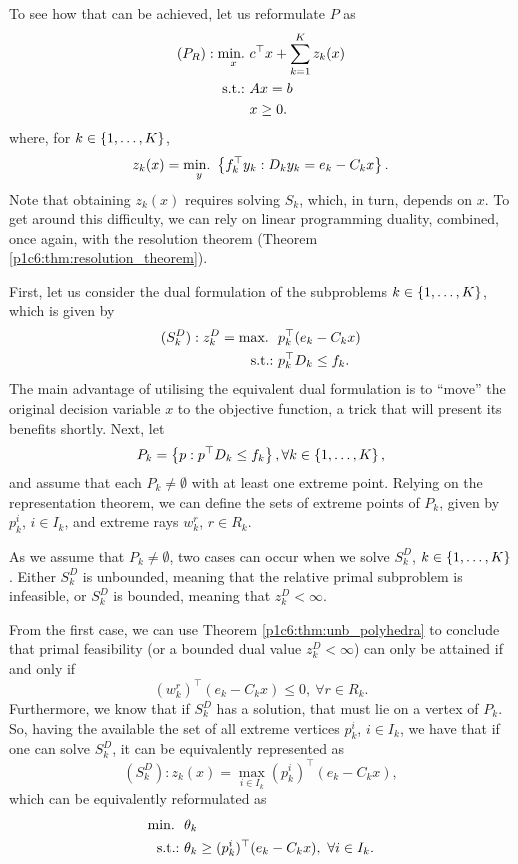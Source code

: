 To see how that can be achieved, let us reformulate $P$ as 
%
\begin{align*}
	(P_R) : \mathop{\text{min.~}}_x & c^\top x + \sum_{k=1}^K z_k(x) \\
	\mathop{\text{s.t.:~}}   & Ax = b \\
	      & x \geq 0.
\end{align*}
%
where, for $k \in \left\{ 1,\dots, K \right \}$,  
%
\begin{equation*}
	z_k(x) = \mathop{\text{min.~}}_y \left\{ f_k^\top y_k : D_ky_k = e_k - C_k x \right \}.	
\end{equation*}
%
Note that obtaining $z_k(x)$ requires solving $S_k$, which, in turn, depends on $x$. To get around this difficulty, we can rely on linear programming duality, combined, once again, with the resolution theorem (Theorem \ref{p1c6:thm:resolution_theorem}).

First, let us consider the dual formulation of the subproblems $k \in \left\{ 1,\dots, K \right \}$, which is given by
%
\begin{align*}
	(S^D_k) : z^D_k = \mathop{\text{max.~}} \ & p_k^\top (e_k - C_k x) \\
	\mathop{\text{s.t.:~}}   & p_k^\top D_k \leq f_k.	 
\end{align*}
%
The main advantage of utilising the equivalent dual formulation is to ``move'' the original decision variable $x$ to the objective function, a trick that will present its benefits shortly. Next, let 
%
\begin{equation}
	P_k =\left\{ p : p^\top D_k \leq f_k \right \}, \forall k \in \left\{ 1,\dots,K \right \}, 
\end{equation}
%
and assume that each $P_k \neq \emptyset$ with at least one extreme point. Relying on the representation theorem, we can define the sets of extreme points of $P_k$, given by $p_k^i$, $i \in I_k$, and extreme rays $w^r_k$, $r \in R_k$.

As we assume that $P_k \neq \emptyset$, two cases can occur when we solve $S^D_k$, $k \in \left\{ 1,\dots, K \right \}$. Either $S^D_k$ is unbounded, meaning that the relative primal subproblem is infeasible, or $S^D_k$ is bounded, meaning that $z^D_k < \infty$.

From the first case, we can use Theorem \ref{p1c6:thm:unb_polyhedra} to conclude that primal feasibility (or a bounded dual value $z^D_k < \infty$) can only be attained if and only if
%
\begin{equation}
	(w^r_k)^\top (e_k - C_k x) \leq 0, \ \forall r \in R_k. \label{p1c7:eq:feas_cut_all}	
\end{equation}
%
Furthermore, we know that if $S^D_k$ has a solution, that must lie on a vertex of $P_k$. So, having the available the set of all extreme vertices $p_k^i$, $i \in I_k$, we have that if one can solve $S^D_k$, it can be equivalently represented as
%
\begin{equation*}
	(S^D_k) : z_k(x) = \max_{i \in I_k} (p^i_k)^\top (e_k - C_k x),
\end{equation*}   
%
which can be equivalently reformulated as
\begin{align}
	\mathop{\text{min.~}} \ & \theta_k \label{p1c7:eq:opt_cut_all1} \\
	\mathop{\text{s.t.:~}} & \theta_k \geq (p^i_k)^\top (e_k - C_k x), \ \forall i \in I_k. \label{p1c7:eq:opt_cut_all2}
\end{align}

